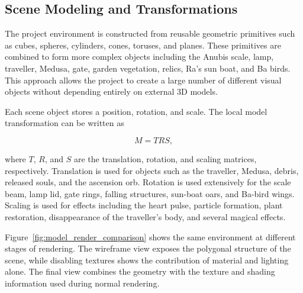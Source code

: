 \documentclass[11pt,a4paper]{article}
\begin{document}

\subsection{Scene Modeling and Transformations}

The project environment is constructed from reusable geometric primitives such
as cubes, spheres, cylinders, cones, toruses, and planes. These primitives are
combined to form more complex objects including the Anubis scale, lamp,
traveller, Medusa, gate, garden vegetation, relics, Ra's sun boat, and Ba
birds. This approach allows the project to create a large number of different
visual objects without depending entirely on external 3D models.

Each scene object stores a position, rotation, and scale. The local model
transformation can be written as

\begin{equation}
    M = TRS ,
\end{equation}

where $T$, $R$, and $S$ are the translation, rotation, and scaling matrices,
respectively. Translation is used for objects such as the traveller, Medusa,
debris, released souls, and the ascension orb. Rotation is used extensively for
the scale beam, lamp lid, gate rings, falling structures, sun-boat oars, and
Ba-bird wings. Scaling is used for effects including the heart pulse, particle
formation, plant restoration, disappearance of the traveller's body, and
several magical effects.

Figure~\ref{fig:model_render_comparison} shows the same environment at
different stages of rendering. The wireframe view exposes the polygonal
structure of the scene, while disabling textures shows the contribution of
material and lighting alone. The final view combines the geometry with the
texture and shading information used during normal rendering.
\end{document}
